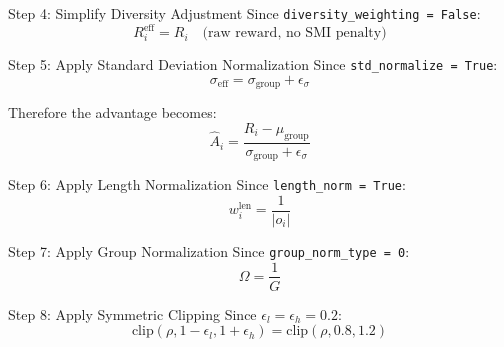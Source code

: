 \documentclass[11pt,a4paper]{article}
\begin{document}
\begin{proofbox}{Step 4: Simplify Diversity Adjustment}
Since \texttt{diversity\_weighting = False}:
\begin{equation}
R_i^{\text{eff}} = R_i \quad \text{(raw reward, no SMI penalty)}
\end{equation}
\end{proofbox}

\begin{proofbox}{Step 5: Apply Standard Deviation Normalization}
Since \texttt{std\_normalize = True}:
\begin{equation}
\sigma_{\text{eff}} = \sigma_{\text{group}} + \epsilon_\sigma
\end{equation}

Therefore the advantage becomes:
\begin{equation}
\hat{A}_i = \frac{R_i - \mu_{\text{group}}}{\sigma_{\text{group}} + \epsilon_\sigma}
\end{equation}
\end{proofbox}

\begin{proofbox}{Step 6: Apply Length Normalization}
Since \texttt{length\_norm = True}:
\begin{equation}
w_i^{\text{len}} = \frac{1}{|o_i|}
\end{equation}
\end{proofbox}

\begin{proofbox}{Step 7: Apply Group Normalization}
Since \texttt{group\_norm\_type = 0}:
\begin{equation}
\Omega = \frac{1}{G}
\end{equation}
\end{proofbox}

\begin{proofbox}{Step 8: Apply Symmetric Clipping}
Since $\epsilon_l = \epsilon_h = 0.2$:
\begin{equation}
\text{clip}(\rho, 1-\epsilon_l, 1+\epsilon_h) = \text{clip}(\rho, 0.8, 1.2)
\end{equation}
\end{proofbox}
\end{document}
